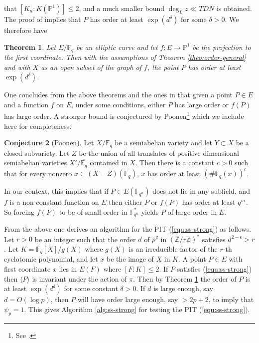 \documentclass[12pt]{article}
\theoremstyle{plain}
\newtheorem{theorem}{Theorem}
\theoremstyle{definition}
\newtheorem{conjecture}[theorem]{Conjecture}
\newcommand{\ang}[1]{\langle#1\rangle}
\def\Z{\ensuremath{\mathbb{Z}}}
\def\F{\ensuremath{\mathbb{F}}}
\def\P{\ensuremath{\mathbb{P}}}
\begin{document}
that $[K_n : K(\P^1)] \le 2$, and a much smaller bound $\deg_L z \ll TDN$ is obtained. The proof of 
\cite[Theorem 1.1]{voloch2010} implies that $P$ has order at least $\exp(d^\delta)$ for some 
$\delta > 0$. We therefore have
\begin{theorem}
	\label{theo:order-ell}
	Let $E/\F_q$ be an elliptic curve and let $f: E \rightarrow \mathbb{P}^1$ be the projection to 
	the first coordinate. Then with the assumptions of Theorem \ref{theo:order-general} and with 
	$X$ as an open subset of the graph of $f$, the point $P$ has order at least $\exp(d^\delta)$.
\end{theorem}
One concludes from the above theorems and the ones in \cite{voloch2010} that given a point $P \in 
E$ and a function $f$ on $E$, under some conditions, either $P$ has large order or $f(P)$ has large 
order. A stronger bound is conjectured by Poonen\footnote{See \cite{voloch2007}.} which we include 
here for completeness.
\begin{conjecture}[Poonen]
	\label{conj:poonen}
	Let $X/\F_q$ be a semiabelian variety and let $Y \subset X$ be a closed subvariety. Let $Z$ be 
	the union of all translates of positive-dimensional semiabelian varieties $X'/\overline{\F_q}$ 
	contained in $X$. Then there is a constant $c > 0$ such that for every nonzero $x \in (X - Z) 
	(\overline{\F_q})$, $x$ has order at least $(\#\F_q(x))^c$.
\end{conjecture}
In our context, this implies that if $P \in E(\F_{q^n})$ does not lie in any subfield, and $f$ is a 
non-constant function on $E$ then either $P$ or $f(P)$ has order at least $q^{n\epsilon}$. So 
forcing $f(P)$ to be of small order in $\F_{q^n}^*$ yields $P$ of large order in $E$.

From the above one derives an algorithm for the PIT (\ref{equ:ss-strong}) as follows. Let $r > 0$ 
be an integer such that the order $d$ of $p^2$ in $(\Z/r\Z)^*$ satisfies $d^{2 - \epsilon} > r$. 
Let $K = \F_q[X]/g(X)$ where $g(X)$ is an irreducible factor of the  $r$-th cyclotomic 
polynomial, and let $x$ be the image of $X$ in $K$. A point $P \in E$ with first coordinate $x$ 
lies in $E(F)$ where $[F : K] \le 2$. If $P$ satisfies (\ref{equ:ss-strong}) then $\ang{P}$ is 
invariant under the action of $\pi$. Then by Theorem \ref{theo:order-ell} the order of $P$ is at 
least $\exp(d^\delta)$ for some constant $\delta > 0$. If $d$ is large enough, say $d = O(\log p)$, 
then $P$ will have order large enough, say $> 2p + 2$, to imply that $\psi_p = 1$. This gives 
Algorithm \ref{alg:ss-strong} for testing the PIT (\ref{equ:ss-strong}).
\end{document}

